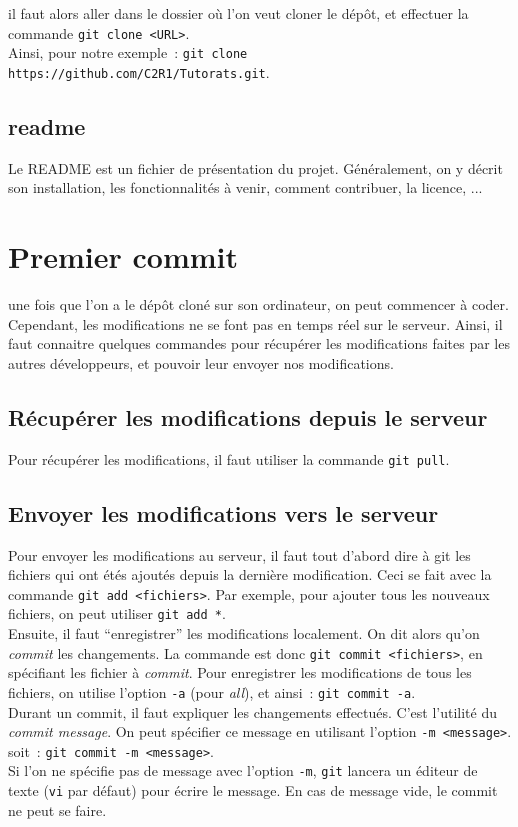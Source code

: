 \documentclass[a4paper,10pt]{report}
\begin{document}
il faut alors aller dans le dossier o\`u l'on veut cloner le d\'ep\^ot, et effectuer la commande \verb|git clone <URL>|.\\
Ainsi, pour notre exemple~: \verb|git clone https://github.com/C2R1/Tutorats.git|.

    \subsection{readme}
Le README est un fichier de présentation du projet. Généralement, on y décrit son installation, les fonctionnalités à venir, comment contribuer, la licence, ...
  \section{Premier commit}
une fois que l'on a le d\'ep\^ot clon\'e sur son ordinateur, on peut commencer \`a coder. Cependant, les modifications ne se font pas en temps r\'eel sur le serveur. Ainsi, il faut connaitre quelques commandes pour r\'ecup\'erer les modifications faites par les autres d\'eveloppeurs, et pouvoir leur envoyer nos modifications.
     \subsection{R\'ecup\'erer les modifications depuis le serveur}
Pour r\'ecup\'erer les modifications, il faut utiliser la commande \verb|git pull|.
     \subsection{Envoyer les modifications vers le serveur}
Pour envoyer les modifications au serveur, il faut tout d'abord dire \`a git les fichiers qui ont \'et\'es ajout\'es depuis la derni\`ere modification. Ceci se fait avec la commande \verb|git add <fichiers>|. Par exemple, pour ajouter tous les nouveaux fichiers, on peut utiliser \verb|git add *|.\\

Ensuite, il faut ``enregistrer'' les modifications localement. On dit alors qu'on \emph{commit} les changements. La commande est donc \verb|git commit <fichiers>|, en sp\'ecifiant les fichier \`a \emph{commit}. Pour enregistrer les modifications de tous les fichiers, on utilise l'option \verb|-a| (pour \emph{all}), et ainsi~: \verb|git commit -a|.\\
Durant un commit, il faut expliquer les changements effectu\'es. C'est l'utilit\'e du \emph{commit message}. On peut sp\'ecifier ce message en utilisant l'option \verb|-m <message>|. soit~: \verb|git commit -m <message>|.\\
Si l'on ne sp\'ecifie pas de message avec l'option \verb|-m|, \verb|git| lancera un \'editeur de texte (\verb|vi| par d\'efaut) pour \'ecrire le message. En cas de message vide, le commit ne peut se faire.\\
\end{document}
